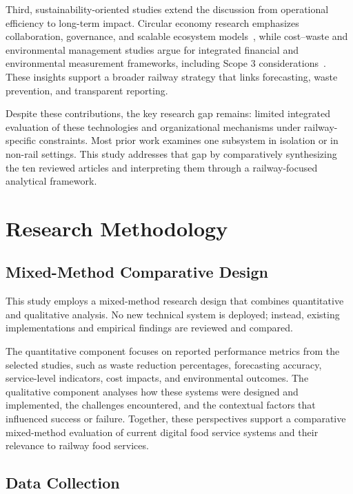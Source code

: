 \documentclass[conference]{IEEEtran}
\begin{document}
Third, sustainability-oriented studies extend the discussion from operational efficiency to long-term impact. Circular economy research emphasizes collaboration, governance, and scalable ecosystem models~\cite{ce4re2025}, while cost--waste and environmental management studies argue for integrated financial and environmental measurement frameworks, including Scope 3 considerations~\cite{pathway10,envmgmt2025}. These insights support a broader railway strategy that links forecasting, waste prevention, and transparent reporting.

Despite these contributions, the key research gap remains: limited integrated evaluation of these technologies and organizational mechanisms under railway-specific constraints. Most prior work examines one subsystem in isolation or in non-rail settings. This study addresses that gap by comparatively synthesizing the ten reviewed articles and interpreting them through a railway-focused analytical framework.

\section{Research Methodology}

\subsection{Mixed-Method Comparative Design}

This study employs a mixed-method research design that combines quantitative and qualitative analysis. No new technical system is deployed; instead, existing implementations and empirical findings are reviewed and compared.

The quantitative component focuses on reported performance metrics from the selected studies, such as waste reduction percentages, forecasting accuracy, service-level indicators, cost impacts, and environmental outcomes. The qualitative component analyses how these systems were designed and implemented, the challenges encountered, and the contextual factors that influenced success or failure. Together, these perspectives support a comparative mixed-method evaluation of current digital food service systems and their relevance to railway food services.

\subsection{Data Collection}
\end{document}
